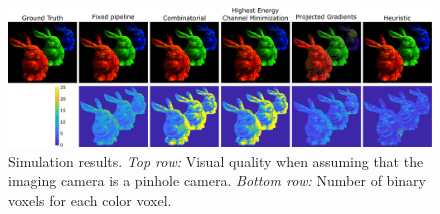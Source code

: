 \begin{figure}[ht!]
\centering
\includegraphics[width=0.99\columnwidth]{images/volumetric/acd_exp2/exp_pinhole}
\caption[Volumetric NED: Adaptive decomposition results: pinhole-camera reconstruction and number of binary voxels]{Simulation results. \emph{Top row:} Visual quality when assuming that the imaging camera is a pinhole camera. \emph{Bottom row:} Number of binary voxels for each color voxel.}
\label{fig:volumetric:acd:exp2:pinhole}
\end{figure}

